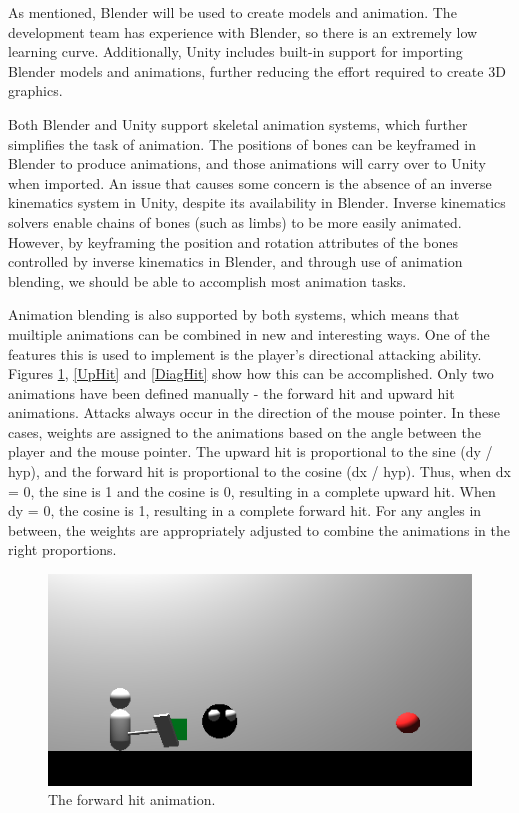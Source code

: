 \documentclass{article}
\begin{document}
As mentioned, Blender will be used to create models and animation.  The development team has experience with Blender, so there is an extremely low learning curve.  Additionally, Unity includes built-in support for importing Blender models and animations, further reducing the effort required to create 3D graphics.

Both Blender and Unity support skeletal animation systems, which further simplifies the task of animation.  The positions of bones can be keyframed in Blender to produce animations, and those animations will carry over to Unity when imported.  An issue that causes some concern is the absence of an inverse kinematics system in Unity, despite its availability in Blender.  Inverse kinematics solvers enable chains of bones (such as limbs) to be more easily animated.  However, by keyframing the position and rotation attributes of the bones controlled by inverse kinematics in Blender, and through use of animation blending, we should be able to accomplish most animation tasks.

Animation blending is also supported by both systems, which means that muiltiple animations can be combined in new and interesting ways.  One of the features this is used to implement is the player's directional attacking ability.  Figures \ref{ForwardHit}, \ref{UpHit} and \ref{DiagHit} show how this can be accomplished.  Only two animations have been defined manually - the forward hit and upward hit animations.  Attacks always occur in the direction of the mouse pointer.  In these cases, weights are assigned to the animations based on the angle between the player and the mouse pointer.  The upward hit is proportional to the sine (dy / hyp), and the forward hit is proportional to the cosine (dx / hyp).  Thus, when dx = 0, the sine is 1 and the cosine is 0, resulting in a complete upward hit.  When dy = 0, the cosine is 1, resulting in a complete forward hit.  For any angles in between, the weights are appropriately adjusted to combine the animations in the right proportions.

\begin{figure}[h!]

\includegraphics[width=5in]{Graphics/forwardHit.png}
\caption{The forward hit animation.}
\label{ForwardHit}

\end{figure}
\end{document}
